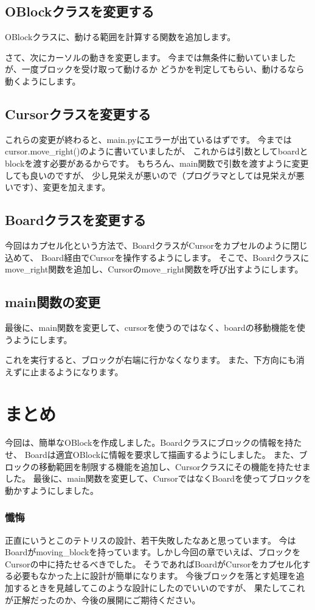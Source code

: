 \subsection{OBlockクラスを変更する}
OBlockクラスに、動ける範囲を計算する関数を追加します。

さて、次にカーソルの動きを変更します。
今までは無条件に動いていましたが、一度ブロックを受け取って動けるか
どうかを判定してもらい、動けるなら動くようにします。

\subsection{Cursorクラスを変更する}

これらの変更が終わると、main.pyにエラーが出ているはずです。
今まではcursor.move\_right()のように書いていましたが、
これからは引数としてboardとblockを渡す必要があるからです。
もちろん、main関数で引数を渡すように変更しても良いのですが、
少し見栄えが悪いので（プログラマとしては見栄えが悪いです）、変更を加えます。
\subsection{Boardクラスを変更する}
今回はカプセル化という方法で、BoardクラスがCursorをカプセルのように閉じ込めて、
Board経由でCursorを操作するようにします。
そこで、Boardクラスにmove\_right関数を追加し、Cursorのmove\_right関数を呼び出すようにします。

\subsection{main関数の変更}
最後に、main関数を変更して、cursorを使うのではなく、boardの移動機能を使うようにします。

これを実行すると、ブロックが右端に行かなくなります。
また、下方向にも消えずに止まるようになります。

\section{まとめ}
今回は、簡単なOBlockを作成しました。Boardクラスにブロックの情報を持たせ、
Boardは適宜OBlockに情報を要求して描画するようにしました。
また、ブロックの移動範囲を制限する機能を追加し、Cursorクラスにその機能を持たせました。
最後に、main関数を変更して、CursorではなくBoardを使ってブロックを動かすようにしました。

\subsubsection{懺悔}
正直にいうとこのテトリスの設計、若干失敗したなあと思っています。
今はBoardがmoving\_blockを持っています。しかし今回の章でいえば、ブロックをCursorの中に持たせるべきでした。
そうであればBoardがCursorをカプセル化する必要もなかった上に設計が簡単になります。
今後ブロックを落とす処理を追加するときを見越してこのような設計にしたのでいいのですが、
果たしてこれが正解だったのか、今後の展開にご期待ください。